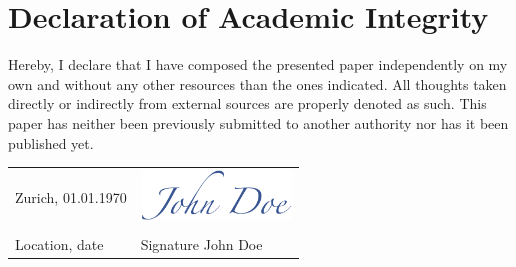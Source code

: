 \section*{Declaration of Academic Integrity}
\label{sec:authenticity_agreement}

Hereby, I declare that I have composed the presented paper independently on my own and without any other resources than the ones indicated. All thoughts taken directly or indirectly from external sources are properly denoted as such. This paper has neither been previously submitted to another authority nor has it been published yet.

\vspace{1cm}

\noindent\begin{tabular}{@{}ll}
	Zurich, 01.01.1970 & \includegraphics[width=4cm]{Resources/AuthenticityAgreement/signature} \\[-1.5ex]
	\makebox[6cm]{\hrulefill} & \makebox[6cm]{\hrulefill}\\ 
	Location, date & Signature John Doe\\
\end{tabular}

